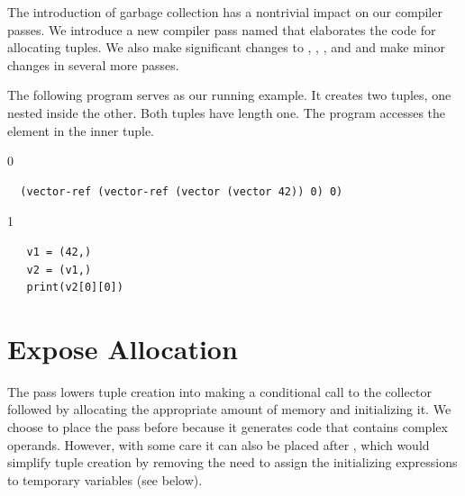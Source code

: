 \documentclass[7x10]{TimesAPriori_MIT}%
\def\racketEd{0}
\def\pythonEd{1}
\providecommand{\BookEdition}{1}
\let\edition\BookEdition
\newcommand{\pythonColor}[0]{}
\numberwithin{theorem}{chapter}
\numberwithin{definition}{chapter}
\numberwithin{equation}{chapter}
\begin{document}
The introduction of garbage collection has a nontrivial impact on our
compiler passes. We introduce a new compiler pass named
 that elaborates the code for allocating
tuples. We also make significant changes to
, ,
, and  and
make minor changes in several more passes.

The following program serves as our running example.  It creates
two tuples, one nested inside the other. Both tuples have length
one. The program accesses the element in the inner tuple.
{\if\edition\racketEd
\begin{lstlisting}
  (vector-ref (vector-ref (vector (vector 42)) 0) 0)
\end{lstlisting}
\fi}
{\if\edition\pythonEd\pythonColor
\begin{lstlisting}
   v1 = (42,)
   v2 = (v1,)
   print(v2[0][0])
\end{lstlisting}
\fi}





\section{Expose Allocation}
\label{sec:expose-allocation}

The pass  lowers tuple creation into making a
conditional call to the collector followed by allocating the
appropriate amount of memory and initializing it.  We choose to place
the  pass before
 because it generates code that
contains complex operands. However, with some care it can also be
placed after , which would simplify
tuple creation by removing the need to assign the initializing
expressions to temporary variables (see below).
\end{document}
